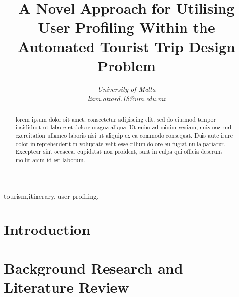 \documentclass[conference]{IEEEtran}
\title{A Novel Approach for Utilising User Profiling Within the
       Automated Tourist Trip Design Problem}
\author{\IEEEauthorblockN{Liam Attard [0299300L] }
\IEEEauthorblockA{Department of Artificial Intelligence}
\textit{University of Malta}\\
\textit{liam.attard.18@um.edu.mt}}
\begin{document}
  \maketitle

  \begin{abstract}
    lorem ipsum dolor sit amet, consectetur adipiscing elit, sed do
    eiusmod tempor incididunt ut labore et dolore magna aliqua. Ut
    enim ad minim veniam, quis nostrud exercitation ullamco laboris
    nisi ut aliquip ex ea commodo consequat. Duis aute irure dolor in
    reprehenderit in voluptate velit esse cillum dolore eu fugiat
    nulla pariatur. Excepteur sint occaecat cupidatat non proident,
    sunt in culpa qui officia deserunt mollit anim id est laborum.
  \end{abstract}

  \begin{IEEEkeywords}
  tourism,itinerary, user-profiling.
  \end{IEEEkeywords}

  \section{Introduction}
    

  \section{Background Research and Literature Review}
    

  
  
\end{document}
